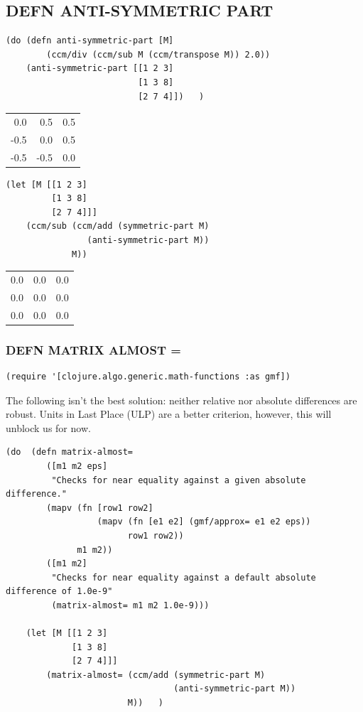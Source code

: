 \documentclass[10pt,oneside,x11names]{article}
\begin{document}
\subsection{DEFN ANTI-SYMMETRIC PART}
\label{sec:orgf908a6e}

\begin{verbatim}
(do (defn anti-symmetric-part [M]
        (ccm/div (ccm/sub M (ccm/transpose M)) 2.0))
    (anti-symmetric-part [[1 2 3]
                          [1 3 8]
                          [2 7 4]])   )
\end{verbatim}

\begin{center}
\begin{tabular}{rrr}
0.0 & 0.5 & 0.5\\
-0.5 & 0.0 & 0.5\\
-0.5 & -0.5 & 0.0\\
\end{tabular}
\end{center}

\begin{verbatim}
(let [M [[1 2 3]
         [1 3 8]
         [2 7 4]]]
    (ccm/sub (ccm/add (symmetric-part M)
                (anti-symmetric-part M))
             M))
\end{verbatim}

\begin{center}
\begin{tabular}{rrr}
0.0 & 0.0 & 0.0\\
0.0 & 0.0 & 0.0\\
0.0 & 0.0 & 0.0\\
\end{tabular}
\end{center}

\subsubsection{DEFN MATRIX ALMOST =}
\label{near-equality-for-matrices}
\begin{verbatim}
(require '[clojure.algo.generic.math-functions :as gmf])
\end{verbatim}

The following isn't the best solution: neither relative nor absolute differences
are robust. Units in Last Place (ULP) are a better criterion, however, this will
unblock us for now.

\begin{verbatim}
(do  (defn matrix-almost=
        ([m1 m2 eps]
         "Checks for near equality against a given absolute difference."
        (mapv (fn [row1 row2]
                  (mapv (fn [e1 e2] (gmf/approx= e1 e2 eps))
                        row1 row2))
              m1 m2))
        ([m1 m2]
         "Checks for near equality against a default absolute difference of 1.0e-9"
         (matrix-almost= m1 m2 1.0e-9)))

    (let [M [[1 2 3]
             [1 3 8]
             [2 7 4]]]
        (matrix-almost= (ccm/add (symmetric-part M)
                                 (anti-symmetric-part M))
                        M))   )
\end{verbatim}
\end{document}
